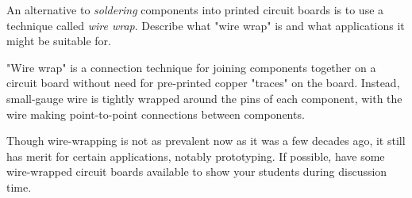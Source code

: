 

An alternative to {\it soldering} components into printed circuit boards is to use a technique called {\it wire wrap}.  Describe what "wire wrap" is and what applications it might be suitable for.







"Wire wrap" is a connection technique for joining components together on a circuit board without need for pre-printed copper "traces" on the board.  Instead, small-gauge wire is tightly wrapped around the pins of each component, with the wire making point-to-point connections between components.







Though wire-wrapping is not as prevalent now as it was a few decades ago, it still has merit for certain applications, notably prototyping.  If possible, have some wire-wrapped circuit boards available to show your students during discussion time.





